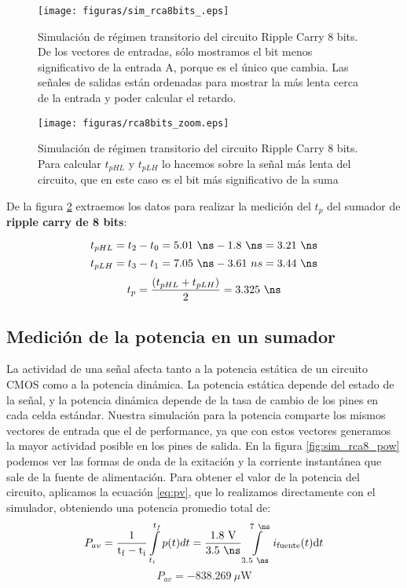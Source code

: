 \begin{figure}
  \centering
\texttt{[image: figuras/sim\_rca8bits\_.eps]}
  \caption{Simulación de régimen transitorio del circuito Ripple Carry 8 bits. De los vectores de entradas, sólo mostramos el bit menos significativo de la entrada A, porque es el único que cambia. Las señales de salidas están ordenadas para mostrar la más lenta cerca de la entrada y poder calcular el retardo.}
\label{fig:sim_rca8}
\end{figure}

\begin{figure}
  \centering
 \texttt{[image: figuras/rca8bits\_zoom.eps]}
  \caption{Simulación de régimen transitorio del circuito Ripple Carry 8 bits. Para calcular $t_{pHL}$ y $t_{pLH}$ lo hacemos sobre la señal más lenta del circuito, que en este caso es el bit más significativo de la suma }
\label{fig:sim_rca8_zoom} 
\end{figure}
De la figura \ref{fig:sim_rca8_zoom} extraemos los datos para realizar la medición del $t_p$ del sumador de \textbf{ripple carry de 8 bits}:


$$t_{pHL} = t_2 - t_0 = 5.01~\ns - 1.8~\ns = 3.21~\ns$$
$$t_{pLH} = t_3 - t_1 = 7.05~\ns - 3.61~ns = 3.44~\ns$$
$$t_p = \frac{(t_{pHL} + t_{pLH} )}{2} = 3.325~\ns$$



\subsection{Medición de la potencia en un sumador}\label{sec:potencia}

La actividad de una señal afecta tanto a la potencia estática de un circuito CMOS como a la potencia dinámica. La potencia estática depende del estado de la señal, y la potencia dinámica depende de la tasa de cambio de los pines en cada celda estándar. Nuestra simulación para la potencia comparte los mismos vectores de entrada que el de performance, ya que con estos vectores generamos la mayor actividad posible en los pines de salida. En la figura \ref{fig:sim_rca8_pow} podemos ver las formas de onda de la exitación y la corriente instantánea que sale de la fuente de alimentación. Para obtener el valor de la potencia del circuito, aplicamos la ecuación \ref{eq:pv}, que lo realizamos directamente con el simulador, obteniendo una potencia promedio total de:
$$P_{av} = \frac{1}{\mathrm{{t_f - t_i}}}\int\limits_{t_i}^{t_f} p(t)dt = \mathrm{\frac{1.8~V}{3.5~\ns}}\int\limits_{3.5~\ns}^{7~\ns} i_{\mathrm{fuente}}(t)\mathrm{d}t $$
$$P_{av} = -838.269~\mu\textrm{W}$$

